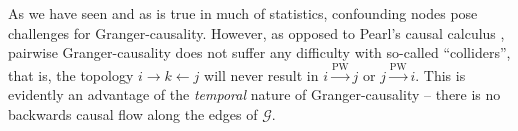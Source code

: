 \documentclass[12pt]{article}
\def\pwgc{\overset{\text{PW}}{\rightarrow}}  %
\def\gcg{\mathcal{G}}  %
\def\VAR{\mathsf{VAR}}  %
\begin{document}
  


\begin{remark}
  As we have seen and as is true in much of statistics, confounding
  nodes pose challenges for Granger-causality.  However, as opposed to
  Pearl's causal calculus \cite{pearl2000art}, pairwise
  Granger-causality does not suffer any difficulty with so-called
  ``colliders'', that is, the topology $i \rightarrow k \leftarrow j$
  will never result in $i \pwgc j$ or $j \pwgc i$.  This is evidently
  an advantage of the \textit{temporal} nature of Granger-causality -- there is
  no backwards causal flow along the edges of $\gcg$.
\end{remark}
\end{document}
